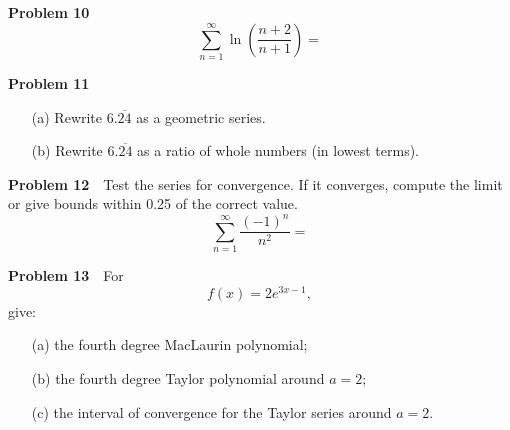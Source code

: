 \documentclass[10pt]{article}
\newcommand{\prob}[1]{\vspace{10mm} \noindent \textbf{Problem #1} \,\,}
\begin{document}

\vspace{5mm}

\prob{10} \[ \sum_{n = 1}^{\infty} \ln\left(\frac{n+2}{n+1}\right) = \]

\prob{11} 
\begin{itemize}
\item[(a) ] Rewrite $6.\overline{24}$ as a geometric series.
\item[(b) ] Rewrite $6.\overline{24}$ as a ratio of whole numbers (in lowest terms).
\end{itemize}




\prob{12} Test the series for convergence. If it converges, compute the limit or give bounds within 0.25 of the correct value.
\[ \sum_{n = 1}^{\infty} \frac{(-1)^n}{n^2} = \]



\prob{13} For \[ f(x) = 2 e^{3x-1}, \]
give:
\begin{itemize}
\item[(a) ] the fourth degree MacLaurin polynomial;
\item[(b) ] the fourth degree Taylor polynomial around $a = 2$; 
\item[(c) ] the interval of convergence for the Taylor series around $a=2$. 
\end{itemize}


\end{document}
